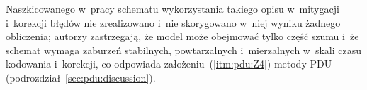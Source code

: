 Naszkicowanego w~pracy schematu wykorzystania takiego opisu w~mitygacji i~korekcji błędów nie zrealizowano i~nie skorygowano w~niej wyniku żadnego obliczenia; autorzy zastrzegają, że model może obejmować tylko część szumu i~że schemat wymaga zaburzeń stabilnych, powtarzalnych i~mierzalnych w~skali czasu kodowania i~korekcji, co odpowiada założeniu~(\ref{itm:pdu:Z4}) metody PDU (podrozdział~\ref{sec:pdu:discussion}).
